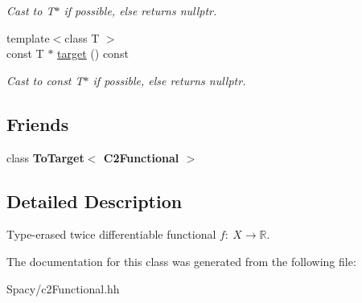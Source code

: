 \begin{DoxyCompactItemize}
\begin{DoxyCompactList}\small\item\em Cast to T$\ast$ if possible, else returns nullptr. \end{DoxyCompactList}\item 
\hypertarget{structSpacy_1_1Mixin_1_1ToTarget_a98985b22f6fc98d253c8416c54a5e359}{}{\footnotesize template$<$class T $>$ }\\const T $\ast$ \hyperlink{structSpacy_1_1Mixin_1_1ToTarget_a98985b22f6fc98d253c8416c54a5e359}{target} () const \label{structSpacy_1_1Mixin_1_1ToTarget_a98985b22f6fc98d253c8416c54a5e359}

\begin{DoxyCompactList}\small\item\em Cast to const T$\ast$ if possible, else returns nullptr. \end{DoxyCompactList}\end{DoxyCompactItemize}
\subsection*{Friends}
\begin{DoxyCompactItemize}
\item 
\hypertarget{classSpacy_1_1C2Functional_a1cfee30028cfdede784183fe10f6e32e}{}class {\bfseries To\+Target$<$ C2\+Functional $>$}\label{classSpacy_1_1C2Functional_a1cfee30028cfdede784183fe10f6e32e}

\end{DoxyCompactItemize}


\subsection{Detailed Description}
Type-\/erased twice differentiable functional $f:\ X \to \mathbb{R} $. 

The documentation for this class was generated from the following file\+:\begin{DoxyCompactItemize}
\item 
Spacy/c2\+Functional.\+hh\end{DoxyCompactItemize}
